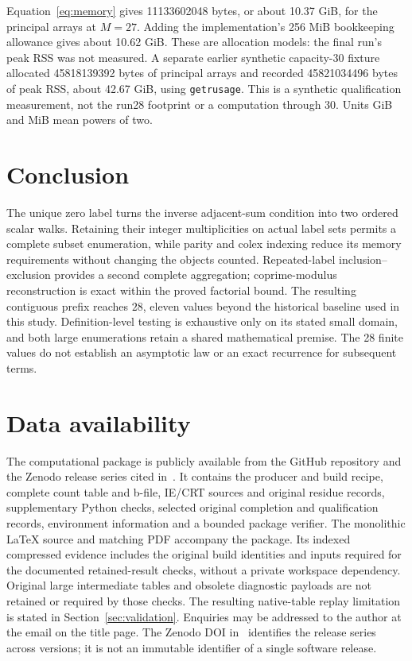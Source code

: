 \documentclass[11pt]{article}
\theoremstyle{definition}
\theoremstyle{remark}
\begin{document}
Equation~\eqref{eq:memory} gives 11133602048 bytes, or about 10.37 GiB,
for the principal arrays at $M=27$. Adding the implementation's 256 MiB
bookkeeping allowance gives about 10.62 GiB. These are allocation models:
the final run's peak RSS was not measured. A separate earlier synthetic
capacity-30 fixture allocated 45818139392 bytes of principal arrays and
recorded 45821034496 bytes of peak RSS, about 42.67 GiB, using
\texttt{getrusage}. This is a synthetic qualification measurement, not
the run28 footprint or a computation through 30. Units GiB and MiB mean
powers of two.

\section{Conclusion}

The unique zero label turns the inverse adjacent-sum condition into two
ordered scalar walks. Retaining their integer multiplicities on actual
label sets permits a complete subset enumeration, while parity and colex
indexing reduce its memory requirements without changing the objects counted.
Repeated-label inclusion--exclusion provides a second complete aggregation;
coprime-modulus reconstruction is exact within the proved factorial bound.
The resulting contiguous prefix reaches $28$, eleven values beyond the
historical baseline used in this study. Definition-level testing is exhaustive
only on its stated small domain, and both large enumerations retain a shared
mathematical premise. The 28 finite values do not establish an asymptotic law
or an exact recurrence for subsequent terms.

\section*{Data availability}

The computational package is publicly available from the GitHub repository
and the Zenodo release series cited in~\cite{corti}. It contains the producer
and build recipe, complete count table and b-file, IE/CRT sources and original
residue records, supplementary Python checks, selected original completion
and qualification records, environment information and a bounded package
verifier. The monolithic LaTeX source and matching PDF accompany the package.
Its indexed compressed evidence includes the original build identities and
inputs required for the documented retained-result checks, without a private
workspace dependency. Original large intermediate tables and obsolete
diagnostic payloads are not retained or required by those checks.
The resulting native-table replay limitation is stated in
Section~\ref{sec:validation}. Enquiries may be addressed to the author
at the email on the title page.
The Zenodo DOI in~\cite{corti} identifies the release series across versions;
it is not an immutable identifier of a single software release.
\end{document}
